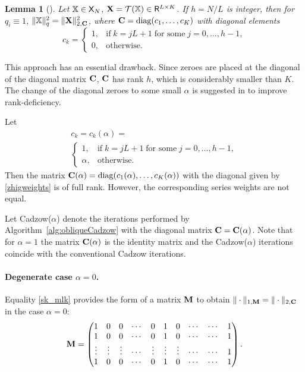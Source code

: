 \documentclass[sii]{ipart}
\newtheorem{lemma}{Lemma}
\begin{document}
\begin{lemma}[\cite{Gillard2014}]
	\label{zhiglemma}
	Let $\mathbb{X} \in \mathsf{X}_N$, $\mathbf{X} = \mathcal{T}(\mathbb{X}) \in \mathsf{R}^{L \times K}$. If $h = N/L$ is integer, then for $q_i\equiv 1$,  $\|\mathbb{X}\|^2_q = \|\mathbf{X}\|^2_{2, \mathbf{C}}$, where $\mathbf{C}=\mathop{\mathrm{diag}}(c_1,\ldots,c_K)$ with diagonal elements
	\begin{equation*}
	c_k = \begin{cases}
	1, & \text{if} \; k = jL+1 \;\text{for some} \; j = 0, \ldots, h-1, \\
	0, & \text{otherwise}.
	\end{cases}
	\end{equation*}
\end{lemma}

This approach has an essential drawback. Since zeroes are placed at the diagonal of the diagonal matrix $\mathbf{C}$, $\mathbf{C}$ has rank $h$, which is considerably smaller than $K$. The change of the diagonal zeroes to some small $\alpha$ is suggested in \cite{Gillard2014} to improve rank-deficiency.

Let
\begin{multline}\label{zhigweights}
c_k = c_k(\alpha) =\\ \begin{cases}
1, & \text{if} \; k = jL+1 \; \text{for some} \; j = 0, \ldots, h-1, \\
\alpha, & \text{otherwise.}
\end{cases}
\end{multline}
Then the matrix $\mathbf{C}(\alpha)=\mathop{\mathrm{diag}}(c_1(\alpha),\ldots,c_K(\alpha))$ with the diagonal given by \eqref{zhigweights} is of full rank.
However, the corresponding series weights are not equal.

Let Cadzow($\alpha$) denote the iterations performed by Algorithm~\ref{alg:obliqueCadzow} with the diagonal matrix $\mathbf{C}=\mathbf{C}(\alpha)$.
	Note that for $\alpha=1$ the matrix $\mathbf{C}(\alpha)$ is the identity matrix and the Cadzow($\alpha$) iterations coincide with the conventional Cadzow iterations.

\paragraph*{Degenerate case $\alpha=0$.}

Equality \eqref{sk_mlk} provides the form of a matrix $\mathbf{M}$ to obtain $\|\cdot\|_{1, \mathbf{M}} = \|\cdot\|_{2, \mathbf{C}}$ in the case $\alpha = 0$:
\begin{equation}
\label{eq:degenerateM}
\bfM = \begin{pmatrix}
1 & 0 & 0 & \cdots & 0 & 1 & 0 & \cdots & \cdots & 1 \\
1 & 0 & 0 & \cdots & 0 & 1 & 0 & \cdots & \cdots & 1 \\
\vdots & \vdots & \vdots & \cdots & \vdots & \vdots & \vdots & \cdots & \cdots & 1 \\
1 & 0 & 0 & \cdots & 0 & 1 & 0 & \cdots & \cdots & 1
\end{pmatrix}.
\end{equation}
\end{document}
